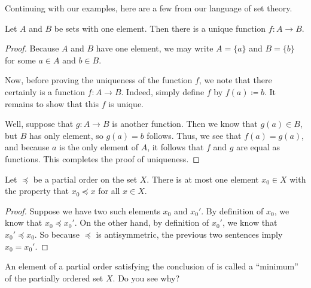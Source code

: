 \documentclass[../notes.tex]{subfiles}
\begin{document}
Continuing with our examples, here are a few from our language of set theory.
\begin{example}
    Let $A$ and $B$ be sets with one element. Then there is a unique function $f\colon A\to B$.
\end{example}
\begin{proof}
    Because $A$ and $B$ have one element, we may write $A=\{a\}$ and $B=\{b\}$ for some $a\in A$ and $b\in B$.

    Now, before proving the uniqueness of the function $f$, we note that there certainly is a function $f\colon A\to B$. Indeed, simply define $f$ by $f(a)\coloneqq b$. It remains to show that this $f$ is unique.

    Well, suppose that $g\colon A\to B$ is another function. Then we know that $g(a)\in B$, but $B$ has only element, so $g(a)=b$ follows. Thus, we see that $f(a)=g(a)$, and because $a$ is the only element of $A$, it follows that $f$ and $g$ are equal as functions. This completes the proof of uniqueness.
\end{proof}
\begin{example} \label{ex:unique-minimum-poset}
    Let $\preceq$ be a partial order on the set $X$. There is at most one element $x_0\in X$ with the property that $x_0\preceq x$ for all $x\in X$.
\end{example}
\begin{proof}
    Suppose we have two such elements $x_0$ and $x_0'$. By definition of $x_0$, we know that $x_0\preceq x_0'$. On the other hand, by definition of $x_0'$, we know that $x_0'\preceq x_0$. So because $\preceq$ is antisymmetric, the previous two sentences imply $x_0=x_0'$.
\end{proof}
\begin{remark}
    An element of a partial order satisfying the conclusion of  is called a ``minimum'' of the partially ordered set $X$. Do you see why?
\end{remark}
\end{document}
